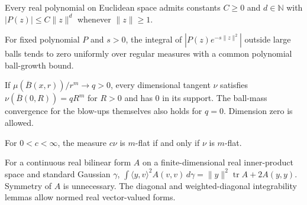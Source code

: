 \begin{lemma}
\label{lem:polynomial-norm-growth}

Every real polynomial on Euclidean space admits constants $C\ge0$ and $d\in\mathbb N$ with $|P(z)|\le C\|z\|^d$ whenever $\|z\|\ge1$.
\end{lemma}

\begin{lemma}
\label{lem:polynomial-gaussian-norm-tails}

For fixed polynomial $P$ and $s>0$, the integral of $|P(z)e^{-s\|z\|^2}|$ outside large balls tends to zero uniformly over regular measures with a common polynomial ball-growth bound.
\end{lemma}

\begin{lemma}
\label{lem:dimensional-tangent-origin-ball-law}

If $\mu(\overline B(x,r))/r^m\to q>0$, every dimensional tangent $\nu$ satisfies $\nu(\overline B(0,R))=qR^m$ for $R>0$ and has $0$ in its support. The ball-mass convergence for the blow-ups themselves also holds for $q=0$. Dimension zero is allowed.
\end{lemma}

\begin{lemma}
\label{lem:flat-positive-scalar}

For $0<c<\infty$, the measure $c\nu$ is $m$-flat if and only if $\nu$ is $m$-flat.
\end{lemma}

\begin{lemma}
\label{lem:gaussian-bilinear-contraction}

For a continuous real bilinear form $A$ on a finite-dimensional real inner-product space and standard Gaussian $\gamma$, $\int\langle y,v\rangle^2 A(v,v)\,d\gamma=\|y\|^2\operatorname{tr}A+2A(y,y)$. Symmetry of $A$ is unnecessary. The diagonal and weighted-diagonal integrability lemmas allow normed real vector-valued forms.
\end{lemma}

